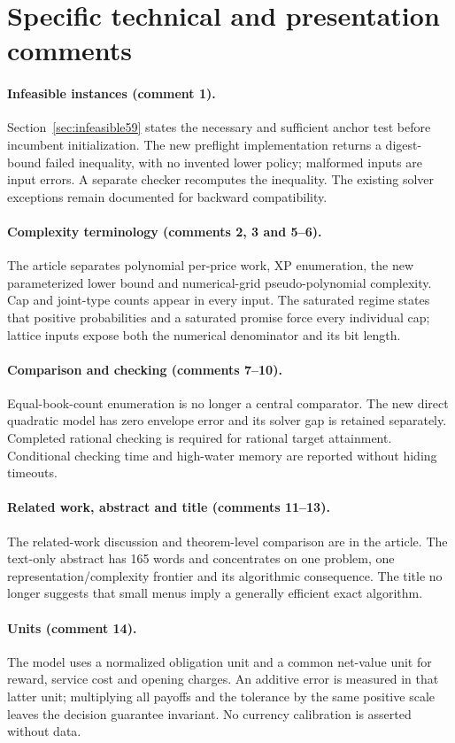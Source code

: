 \section{Specific technical and presentation comments}
\paragraph{Infeasible instances (comment 1).} Section~\ref{sec:infeasible59} states the necessary and sufficient anchor test before incumbent initialization. The new preflight implementation returns a digest-bound failed inequality, with no invented lower policy; malformed inputs are input errors. A separate checker recomputes the inequality. The existing solver exceptions remain documented for backward compatibility.
\paragraph{Complexity terminology (comments 2, 3 and 5--6).} The article separates polynomial per-price work, XP enumeration, the new parameterized lower bound and numerical-grid pseudo-polynomial complexity. Cap and joint-type counts appear in every input. The saturated regime states that positive probabilities and a saturated promise force every individual cap; lattice inputs expose both the numerical denominator and its bit length.
\paragraph{Comparison and checking (comments 7--10).} Equal-book-count enumeration is no longer a central comparator. The new direct quadratic model has zero envelope error and its solver gap is retained separately. Completed rational checking is required for rational target attainment. Conditional checking time and high-water memory are reported without hiding timeouts.
\paragraph{Related work, abstract and title (comments 11--13).} The related-work discussion and theorem-level comparison are in the article. The text-only abstract has 165 words and concentrates on one problem, one representation/complexity frontier and its algorithmic consequence. The title no longer suggests that small menus imply a generally efficient exact algorithm.
\paragraph{Units (comment 14).} The model uses a normalized obligation unit and a common net-value unit for reward, service cost and opening charges. An additive error is measured in that latter unit; multiplying all payoffs and the tolerance by the same positive scale leaves the decision guarantee invariant. No currency calibration is asserted without data.

